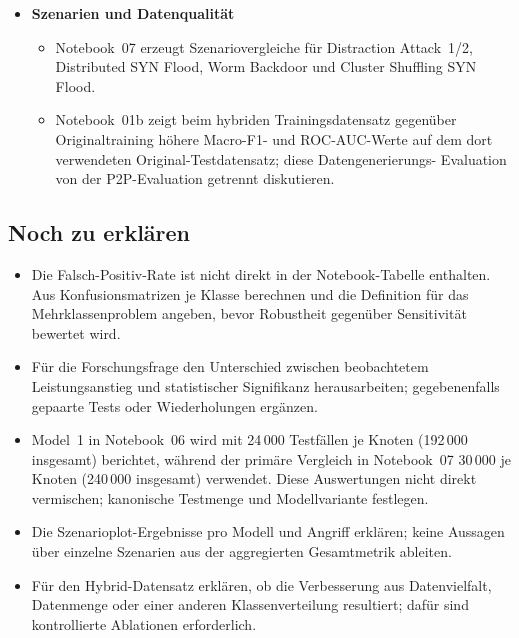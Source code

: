 \begin{itemize}
\begin{itemize}
          Baseline ohne Kontext oder mit Model~1 gleichsetzen.
  \end{itemize}
  \item \textbf{Szenarien und Datenqualität}
  \begin{itemize}
    \item Notebook~07 erzeugt Szenariovergleiche für Distraction Attack~1/2,
          Distributed SYN Flood, Worm Backdoor und Cluster Shuffling
          SYN Flood.
    \item Notebook~01b zeigt beim hybriden Trainingsdatensatz gegenüber
          Originaltraining höhere Macro-F1- und ROC-AUC-Werte auf dem dort
          verwendeten Original-Testdatensatz; diese Datengenerierungs-
          Evaluation von der P2P-Evaluation getrennt diskutieren.
  \end{itemize}
\end{itemize}

\subsection{Noch zu erklären}
\begin{itemize}
  \item Die Falsch-Positiv-Rate ist nicht direkt in der Notebook-Tabelle
        enthalten. Aus Konfusionsmatrizen je Klasse berechnen und die
        Definition für das Mehrklassenproblem angeben, bevor Robustheit
        gegenüber Sensitivität bewertet wird.
  \item Für die Forschungsfrage den Unterschied zwischen beobachtetem
        Leistungsanstieg und statistischer Signifikanz herausarbeiten;
        gegebenenfalls gepaarte Tests oder Wiederholungen ergänzen.
  \item Model~1 in Notebook~06 wird mit 24\,000 Testfällen je Knoten
        (192\,000 insgesamt) berichtet, während der primäre Vergleich in
        Notebook~07 30\,000 je Knoten (240\,000 insgesamt) verwendet.
        Diese Auswertungen nicht direkt vermischen; kanonische Testmenge
        und Modellvariante festlegen.
  \item Die Szenarioplot-Ergebnisse pro Modell und Angriff erklären; keine
        Aussagen über einzelne Szenarien aus der aggregierten Gesamtmetrik
        ableiten.
  \item Für den Hybrid-Datensatz erklären, ob die Verbesserung aus
        Datenvielfalt, Datenmenge oder einer anderen Klassenverteilung
        resultiert; dafür sind kontrollierte Ablationen erforderlich.
\end{itemize}

